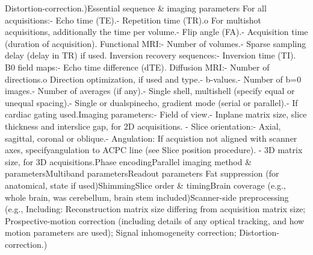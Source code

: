 \documentclass[]{article}
\begin{document}
{{{Distortion-correction.)}{Essential sequence \& imaging parameters For all acquisitions:- Echo time (TE).- Repetition time (TR).o For multishot acquisitions, additionally the time per volume.- Flip angle (FA).- Acquisition time (duration of acquisition). Functional MRI:- Number of volumes.- Sparse sampling delay (delay in TR) if used. Inversion recovery sequences:- Inversion time (TI). B0 field maps:- Echo time difference (dTE). Diffusion MRI:- Number of directions.o Direction optimization, if used and type.- b-values.- Number of b=0 images.- Number of averages (if any).- Single shell, multishell (specify equal or unequal spacing).- Single or dualspinecho, gradient mode (serial or parallel).- If cardiac gating used.Imaging parameters:- Field of view.- Inplane matrix size, slice thickness and interslice gap, for 2D acquisitions. - Slice orientation:- Axial, sagittal, coronal or oblique.- Angulation: If acquistion not aligned with scanner axes, specifyangulation to ACPC line (see Slice position procedure). - 3D matrix size, for 3D acquisitions.Phase encodingParallel imaging method \& parametersMultiband parametersReadout parameters Fat suppression (for anatomical, state if used)ShimmingSlice order \& timingBrain coverage (e.g., whole brain, was cerebellum, brain stem included)Scanner-side preprocessing (e.g., Including: Reconstruction matrix size differing from acquisition matrix size; Prospective-motion correction (including details of any optical tracking, and how motion parameters are used); Signal inhomogeneity correction; Distortion-correction.)}}\label{essential-sequence-imaging-parameters-for-all-acquisitions--echo-time-te.--repetition-time-tr.o-for-multishot-acquisitions-additionally-the-time-per-volume.--flip-angle-fa.--acquisition-time-duration-of-acquisition.-functional-mri--number-of-volumes.--sparse-sampling-delay-delay-in-tr-if-used.-inversion-recovery-sequences--inversion-time-ti.-b0-field-maps--echo-time-difference-dte.-diffusion-mri--number-of-directions.o-direction-optimization-if-used-and-type.--b-values.--number-of-b0-images.--number-of-averages-if-any.--single-shell-multishell-specify-equal-or-unequal-spacing.--single-or-dualspinecho-gradient-mode-serial-or-parallel.--if-cardiac-gating-used.imaging-parameters--field-of-view.--inplane-matrix-size-slice-thickness-and-interslice-gap-for-2d-acquisitions.---slice-orientation--axial-sagittal-coronal-or-oblique.--angulation-if-acquistion-not-aligned-with-scanner-axes-specifyangulation-to-acpc-line-see-slice-position-procedure.---3d-matrix-size-for-3d-acquisitions.phase-encodingparallel-imaging-method-parametersmultiband-parametersreadout-parameters-fat-suppression-for-anatomical-state-if-usedshimmingslice-order-timingbrain-coverage-e.g.-whole-brain-was-cerebellum-brain-stem-includedscanner-side-preprocessing-e.g.-including-reconstruction-matrix-size-differing-from-acquisition-matrix-size-prospective-motion-correction-including-details-of-any-optical-tracking-and-how-motion-parameters-are-used-signal-inhomogeneity-correction-distortion-correction.}}
\end{document}
